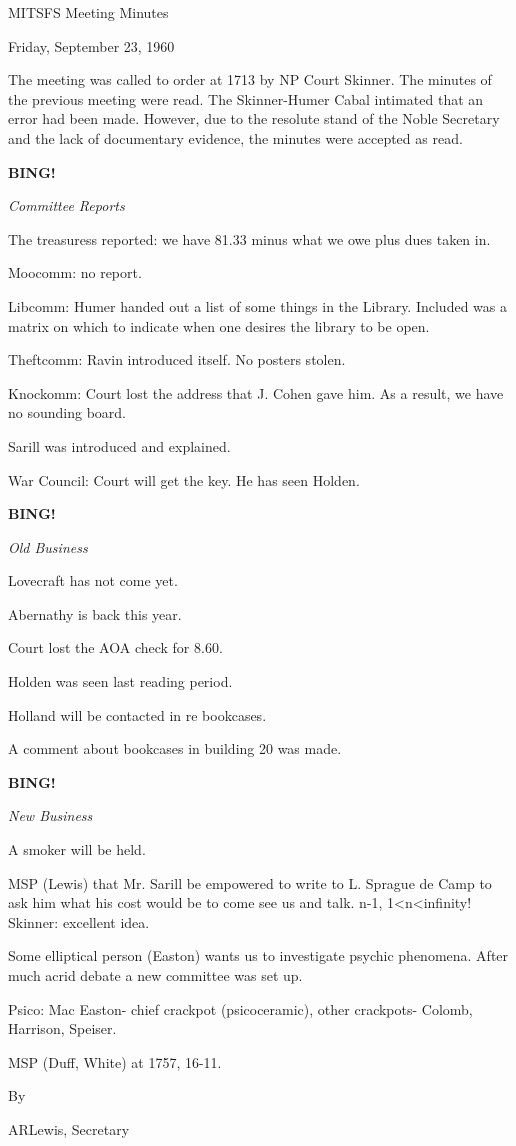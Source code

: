 \documentclass[12pt]{article}
\newcommand{\bing}{{\bf BING!} }
\newcommand{\goto}[1]{\bing \vskip 12pt \centerline{{\em{#1}}}}
\begin{document}
\begin{center}

MITSFS Meeting Minutes

Friday, September 23, 1960

\end{center}
 
\vspace{12pt}

\setlength{\parskip}{6pt}

\noindent
The meeting was called to order at 1713 by NP Court Skinner. The minutes of the previous meeting were read. The Skinner-Humer Cabal intimated that an error had been made. However, due to the resolute stand of the Noble Secretary and the lack of documentary evidence, the minutes were accepted as read.

\goto{Committee Reports}

The treasuress reported: we have 81.33 minus what we owe plus dues taken in.

Moocomm: no report.

Libcomm: Humer handed out a list of some things in the Library. Included was a matrix on which to indicate when one desires the library to be open.

Theftcomm: Ravin introduced itself. No posters stolen.

Knockomm: Court lost the address that J. Cohen gave him. As a result, we have no sounding board.

Sarill was introduced and explained.

War Council: Court will get the key. He has seen Holden.

\goto{Old Business}

Lovecraft has not come yet.

Abernathy is back this year.

Court lost the AOA check for 8.60.

Holden was seen last reading period.

Holland will be contacted in re bookcases.

A comment about bookcases in building 20 was made.

\goto{New Business}

A smoker will be held.

MSP (Lewis) that Mr. Sarill be empowered to write to L. Sprague de Camp to ask him what his cost would be to come see us and talk. n-1, 1<n<infinity! Skinner: excellent idea.

Some elliptical person (Easton) wants us to investigate psychic phenomena. After much acrid debate a new committee was set up.

Psico: Mac Easton- chief crackpot (psicoceramic), other crackpots- Colomb, Harrison, Speiser.

MSP (Duff, White) at 1757, 16-11.

\vspace{12pt}

\centerline{By}
\centerline{ARLewis, Secretary}
\end{document}
